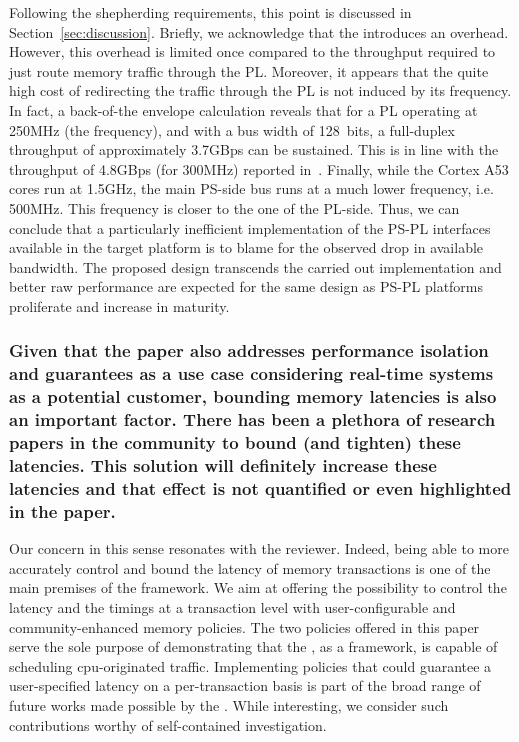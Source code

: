         Following the shepherding requirements, this point is
        discussed in Section~\ref{sec:discussion}. Briefly, we
        acknowledge that the \schim introduces an overhead. However,
        this overhead is limited once compared to the throughput
        required to just route memory traffic through the
        PL. Moreover, it appears that the quite high cost of
        redirecting the traffic through the PL is not induced by its
        frequency. In fact, a back-of-the envelope calculation reveals
        that for a PL operating at 250MHz (the \schim frequency), and
        with a bus width of 128~bits, a full-duplex throughput of
        approximately 3.7GBps can be sustained. This is in line with
        the throughput of 4.8GBps (for 300MHz) reported
        in~\cite{uiuc-xilinx-port-study}.  Finally, while the Cortex
        A53 cores run at 1.5GHz, the main PS-side bus runs at a much
        lower frequency, i.e. 500MHz. This frequency is closer to the
        one of the PL-side. Thus, we can conclude that a particularly
        inefficient implementation of the PS-PL interfaces available
        in the target platform is to blame for the observed drop in
        available bandwidth. The proposed \schim design transcends the
        carried out implementation and better raw performance are
        expected for the same design as PS-PL platforms proliferate
        and increase in maturity.

        \subsubsection{Given that the paper also addresses performance
        isolation and guarantees as a use case considering real-time
        systems as a potential customer, bounding memory latencies is
        also an important factor. There has been a plethora of
        research papers in the community to bound (and tighten) these
        latencies. This solution will definitely increase these
        latencies and that effect is not quantified or even
        highlighted in the paper.}

        Our concern in this sense resonates with the reviewer. Indeed,
        being able to more accurately control and bound the latency of
        memory transactions is one of the main premises of the \schim
        framework. We aim at offering the possibility to control the
        latency and the timings at a transaction level with
        user-configurable and community-enhanced memory policies.  The
        two policies offered in this paper serve the sole purpose of
        demonstrating that the \schim, as a framework, is capable of
        scheduling cpu-originated traffic. Implementing policies that
        could guarantee a user-specified latency on a per-transaction
        basis is part of the broad range of future works made possible
        by the \schim.  While interesting, we consider such
        contributions worthy of self-contained investigation.

